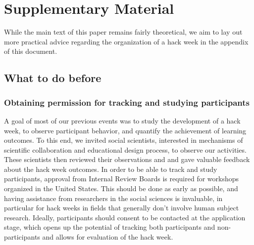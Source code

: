 \documentclass{nature}
\begin{document}


\section{Supplementary Material}

While the main text of this paper remains fairly theoretical, we aim to lay out more practical advice regarding the organization of a hack week in the appendix of this document.

\subsection{What to do before}

\subsubsection{Obtaining permission for tracking and studying participants}
A goal of most of our previous events was to study the development of a hack week, to observe participant behavior, and quantify the achievement of learning outcomes. To this end, we invited social scientists, interested in mechanisms of scientific collaboration and educational design process, to observe our activities. These scientists then reviewed their observations and and gave valuable feedback about the hack week outcomes. In order to be able to track and study participants, approval from Internal Review Boards is required for workshops organized in the United States. This should be done as early as possible, and having assistance from researchers in the social sciences is invaluable, in particular for hack weeks in fields that generally don't involve human subject research. Ideally, participants should consent to be contacted at the application stage, which opens up the potential of tracking both participants and non-participants and allows for evaluation of the hack week.
\end{document}
